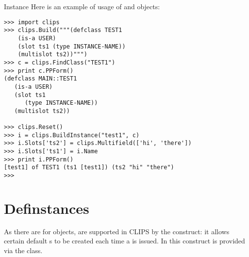 \begin{classdesc*}{Instance}
Here is an example of usage of  and  objects:

\begin{verbatim}
>>> import clips
>>> clips.Build("""(defclass TEST1
    (is-a USER)
    (slot ts1 (type INSTANCE-NAME))
    (multislot ts2))""")
>>> c = clips.FindClass("TEST1")
>>> print c.PPForm()
(defclass MAIN::TEST1
   (is-a USER)
   (slot ts1
      (type INSTANCE-NAME))
   (multislot ts2))

>>> clips.Reset()
>>> i = clips.BuildInstance("test1", c)
>>> i.Slots['ts2'] = clips.Multifield(['hi', 'there'])
>>> i.Slots['ts1'] = i.Name
>>> print i.PPForm()
[test1] of TEST1 (ts1 [test1]) (ts2 "hi" "there")
>>>
\end{verbatim}

\end{classdesc*}



\section{Definstances\label{pyclips-cl-Definstances}}

As there are  for  objects, 
are supported in CLIPS by the  construct: it allows
certain default s to be created each time a
 is issued. In \pyclips{} this construct is provided
via the  class.

